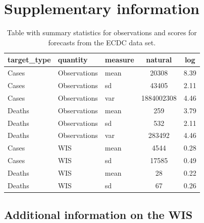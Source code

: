 \documentclass{article}
\begin{document}








\newpage

\appendix
\section{Supplementary information}

\begin{table}[h!]
    \centering
    
    \begin{tabular}{lllcc}
    \toprule
    target\_type & quantity & measure & natural & log\\
    \midrule
    Cases & Observations & mean & 20308 & 8.39\\
    Cases & Observations & sd & 43405 & 2.11\\
    Cases & Observations & var & 1884002308 & 4.46\\
    \addlinespace
    Deaths & Observations & mean & 259 & 3.79\\
    Deaths & Observations & sd & 532 & 2.11\\
    Deaths & Observations & var & 283492 & 4.46\\
    \addlinespace
    \hline
    \addlinespace
    Cases & WIS & mean & 4544 & 0.28\\
    Cases & WIS & sd & 17585 & 0.49\\
    \addlinespace
    Deaths & WIS & mean & 28 & 0.22\\
    Deaths & WIS & sd & 67 & 0.26\\
    \bottomrule
    \end{tabular}
    \caption{Table with summary statistics for observations and scores for forecasts from the ECDC data set.}
    \label{tab:HUB-summary}
\end{table}


\subsection{Additional information on the WIS} \label{wis}
\end{document}
